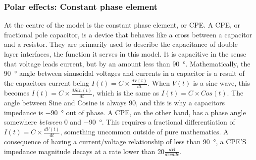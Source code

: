     \subsubsection{Polar effects: Constant phase element}
      At the centre of the model is the constant phase element, or CPE.
      A CPE, or fractional pole capacitor, is a device that behaves like a cross between a capacitor and a resistor.
      They are primarily used to describe the capacitance of double layer interfaces, the function it serves in this model.
      It is capacitive in the sense that voltage leads current, but by an amount less than \SI{90}{\degree}.
      Mathematically, the \SI{90}{\degree} angle between sinusoidal voltages and currents in a capacitor is a result of the capacitors current being $I(t) = C \times \frac{dV(t)}{dt}$.
      When $V(t)$ is a sine wave, this becomes $I(t) = C \times \frac{d Sin(t)}{dt}$, which is the same as $I(t) = C \times Cos(t)$.
      The angle between Sine and Cosine is always 90, and this is why a capacitors impedance is \SI{-90}{\degree} out of phase.
      A CPE, on the other hand, has a phase angle somewhere \emph{between} 0 and \SI{-90}{\degree}.
      This requires a fractional differentiation of $I(t) = C \times \frac{dV(t)}{dt}$, something uncommon outside of pure mathematics.
      A consequence of having a current/voltage relationship of less than \SI{90}{\degree}, a CPE'S impedance magnitude decays at a rate lower than 20$\frac{dB}{decade}$.

